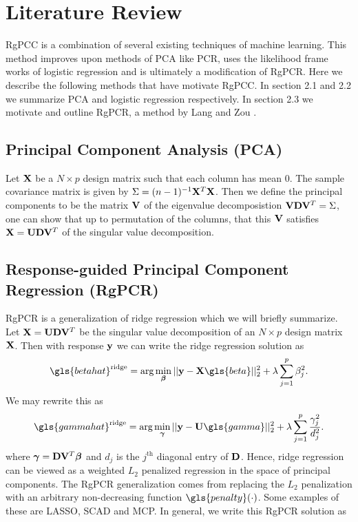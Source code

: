 \documentclass[main.tex]{subfiles}
\begin{document}
\section{Literature Review}
RgPCC is a combination of several existing techniques of machine learning. This method improves upon methods of PCA like PCR, uses the likelihood frame works of logistic regression and is ultimately a modification of RgPCR. Here we describe the following methods that have motivate RgPCC. In section 2.1 and 2.2 we summarize PCA and logistic regression respectively. In section 2.3 we motivate and outline RgPCR, a method by Lang and Zou \citep{langzou}.

\subsection{Principal Component Analysis (PCA)}
Let $\mathbf{X}$ be a $N \times p$ design matrix such that each column has mean 0. The sample covariance matrix is given by $\Sigma = (n-1)^{-1} \mathbf{X}^T \mathbf{X}$. Then we define the principal components to be the matrix $\mathbf{V}$ of the eigenvalue decomposistion $\mathbf{V} \mathbf{D} \mathbf{V}^T = \Sigma$, one can show that up to permutation of the columns, that this $\mathbf{V}$ satisfies $\mathbf{X} = \mathbf{U} \mathbf{D} \mathbf{V}^T$ of the singular value decomposition.

\subsection{Response-guided Principal Component Regression (RgPCR)}
RgPCR is a generalization of ridge regression which we will briefly summarize. Let $\mathbf{X} = \mathbf{U} \mathbf{D} \mathbf{V}^T$ be the singular value decomposition of an $N \times p$ design matrix $\mathbf{X}$. Then with response $\mathbf{y}$ we can write the ridge regression solution as
\begin{align}
    \gls{betahat}^{\ridge} = \argmin_{\bbeta} ||\y - \X \gls{beta}||_2^2 + \lambda \sum_{j = 1}^p \beta_j^2.
\end{align}
We may rewrite this as
\begin{align}
    \gls{gammahat}^{\ridge} = \argmin_{\bgamma} ||\y - \U \gls{gamma}||^2_2 + \lambda \sum_{j = 1}^p \frac{\gamma_j^2}{d_j^2}. \label{RgPCR_ridge}
\end{align}
where $\boldsymbol \gamma = \mathbf{D} \mathbf{V}^T \boldsymbol \beta$ and $d_j$ is the $j^{\text{th}}$ diagonal entry of $\mathbf{D}$. Hence, ridge regression can be viewed as a weighted $L_2$ penalized regression in the space of principal components. The RgPCR generalization comes from replacing the $L_2$ penalization with an arbitrary non-decreasing function $\gls{penalty}(\cdot)$. Some examples of these are LASSO, SCAD and MCP. In general, we write this RgPCR solution as
\end{document}
